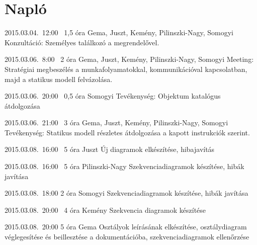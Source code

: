 %
\section{Napló}

\begin{naplo}
	
\bejegyzes
{2015.03.04.~12:00~} %
{1,5 óra} %
{Gema, Juszt, Kemény, Pilinszki-Nagy, Somogyi} %
{Konzultáció: Személyes találkozó a megrendelővel.} %

\bejegyzes
{2015.03.06.~8:00~} %
{2 óra} %
{Gema, Juszt, Kemény, Pilinszki-Nagy, Somogyi} %
{Meeting: Stratégiai megbeszélés a munkafolyamatokkal, kommunikációval kapcsolatban, majd a statikus modell felvázolása.} %

\bejegyzes
{2015.03.06.~20:00~} %
{0,5 óra} %
{Somogyi} %
{Tevékenység: Objektum katalógus átdolgozása} %

\bejegyzes
{2015.03.06.~21:00~}
{3 óra}
{Gema, Juszt, Kemény, Pilinszki-Nagy, Somogyi}
{Tevékenység: Statikus modell részletes átdolgozása a kapott instrukciók szerint.}

\bejegyzes
{2015.03.08.~16:00~} %
{5 óra} %
{Juszt} %
{Új diagramok elkészítése, hibajavítás} %

\bejegyzes
{2015.03.08.~16:00~} %
{5 óra} %
{Pilinszki-Nagy} %
{Szekvenciadiagramok készítése, hibák javítása} %

\bejegyzes
{2015.03.08.~18:00}
{2 óra}
{Somogyi}
{Szekvenciadiagramok készítése, hibák javítása}

\bejegyzes
{2015.03.08.~20:00~} %
{4 óra} %
{Kemény} %
{Szekvencia diagramok készítése} %

\bejegyzes
{2015.03.08.~20:00} %
{5 óra} %
{Gema} %
{Osztályok leírásának elkészítése, osztálydiagram véglegesítése és beillesztése a dokumentációba, szekvenciadiagramok ellenőrzése} %



\end{naplo}


